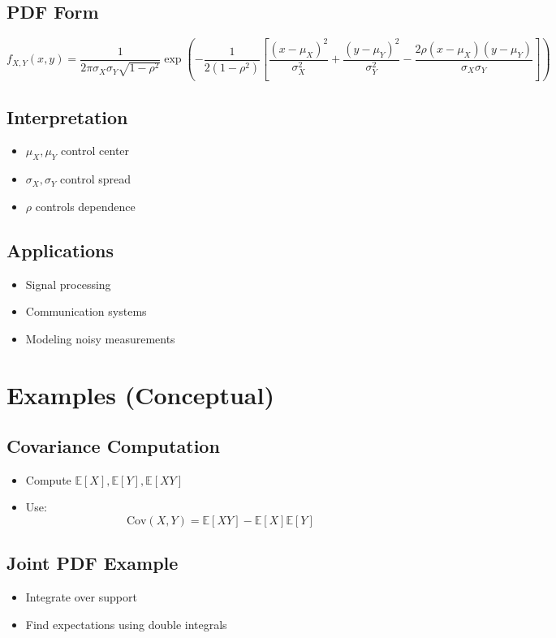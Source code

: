 \documentclass[11pt]{article}
\begin{document}
\subsection{PDF Form}
\[
f_{X,Y}(x,y) =
\frac{1}{2\pi \sigma_X \sigma_Y \sqrt{1-\rho^2}}
\exp\left(
-\frac{1}{2(1-\rho^2)}
\left[
\frac{(x-\mu_X)^2}{\sigma_X^2}
+
\frac{(y-\mu_Y)^2}{\sigma_Y^2}
-
\frac{2\rho(x-\mu_X)(y-\mu_Y)}{\sigma_X \sigma_Y}
\right]
\right)
\]

\subsection{Interpretation}
\begin{itemize}
    \item $\mu_X, \mu_Y$ control center
    \item $\sigma_X, \sigma_Y$ control spread
    \item $\rho$ controls dependence
\end{itemize}

\subsection{Applications}
\begin{itemize}
    \item Signal processing
    \item Communication systems
    \item Modeling noisy measurements
\end{itemize}

\section{Examples (Conceptual)}

\subsection{Covariance Computation}
\begin{itemize}
    \item Compute $\mathbb{E}[X], \mathbb{E}[Y], \mathbb{E}[XY]$
    \item Use:
    \[
    \text{Cov}(X,Y) = \mathbb{E}[XY] - \mathbb{E}[X]\mathbb{E}[Y]
    \]
\end{itemize}

\subsection{Joint PDF Example}
\begin{itemize}
    \item Integrate over support
    \item Find expectations using double integrals
\end{itemize}
\end{document}
